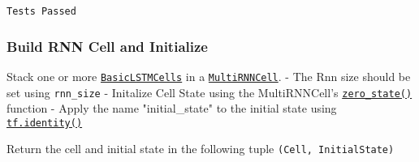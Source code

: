 \documentclass[11pt]{article}
\begin{document}
    \begin{Verbatim}[commandchars=\\\{\}]
Tests Passed

    \end{Verbatim}

    \subsubsection{Build RNN Cell and
Initialize}\label{build-rnn-cell-and-initialize}

Stack one or more
\href{https://www.tensorflow.org/api_docs/python/tf/contrib/rnn/BasicLSTMCell}{\texttt{BasicLSTMCells}}
in a
\href{https://www.tensorflow.org/api_docs/python/tf/contrib/rnn/MultiRNNCell}{\texttt{MultiRNNCell}}.
- The Rnn size should be set using \texttt{rnn\_size} - Initalize Cell
State using the MultiRNNCell's
\href{https://www.tensorflow.org/api_docs/python/tf/contrib/rnn/MultiRNNCell\#zero_state}{\texttt{zero\_state()}}
function - Apply the name "initial\_state" to the initial state using
\href{https://www.tensorflow.org/api_docs/python/tf/identity}{\texttt{tf.identity()}}

Return the cell and initial state in the following tuple
\texttt{(Cell,\ InitialState)}
\end{document}
